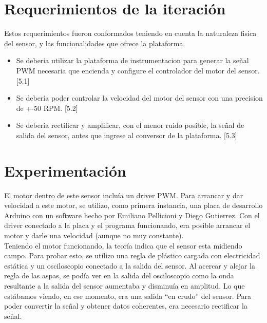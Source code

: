 

\section{Requerimientos de la iteración} %
\label{it6:sec:requerimientos_de_la_iteracion}

Estos requerimientos fueron conformados teniendo en cuenta la naturaleza fisica del sensor, y las funcionalidades que ofrece la plataforma. 

\begin{itemize}
\item Se deberia utilizar la plataforma de instrumentacion para generar la señal PWM necesaria que encienda y configure el controlador del motor del sensor. [5.1]
\item Se debería poder controlar la velocidad del motor del sensor con una precision de +-50 RPM. [5.2]
\item Se debería rectificar y amplificar, con el menor ruido posible, la señal de salida del sensor, antes que ingrese al conversor de la plataforma. [5.3]
\end{itemize}



\section{Experimentación} %
\label{it6:sec:experimentacion}

El motor dentro de este sensor incluía un driver PWM. Para arrancar y dar velocidad a este motor, se utilizo, como primera instancia, una placa de desarrollo Arduino con un software hecho por Emiliano Pellicioni y Diego Gutierrez. Con el driver conectado a la placa y el programa funcionando, era posible arrancar el motor y darle una velocidad (aunque no muy constante). \\

Teniendo el motor funcionando, la teoría indica que el sensor esta midiendo campo. Para probar esto, se utilizo una regla de plástico cargada con electricidad estática y un osciloscopio conectado a la salida del sensor. Al acercar y alejar la regla de las aspas, se podía ver en la salida del osciloscopio como la onda resultante a la salida del sensor aumentaba y disminuía en amplitud. Lo que estábamos viendo, en ese momento, era una salida ``en crudo'' del sensor. Para poder convertir la señal y obtener datos coherentes, era necesario rectificar la señal. \\

